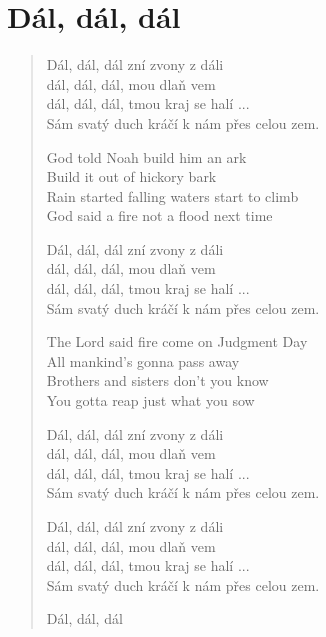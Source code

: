 \section{Dál, dál, dál}

\begin{verse}
Dál, dál, dál zní zvony z dáli \\
dál, dál, dál, mou dlaň vem \\
dál, dál, dál, tmou kraj se halí ... \\
Sám svatý duch kráčí k nám přes celou zem.

God told Noah build him an ark \\
Build it out of hickory bark \\
Rain started falling waters start to climb \\
God said a fire not a flood next time

Dál, dál, dál zní zvony z dáli \\
dál, dál, dál, mou dlaň vem \\
dál, dál, dál, tmou kraj se halí ... \\
Sám svatý duch kráčí k nám přes celou zem.

The Lord said fire come on Judgment Day \\
All mankind's gonna pass away \\
Brothers and sisters don't you know \\
You gotta reap just what you sow

Dál, dál, dál zní zvony z dáli \\
dál, dál, dál, mou dlaň vem \\
dál, dál, dál, tmou kraj se halí ... \\
Sám svatý duch kráčí k nám přes celou zem.

Dál, dál, dál zní zvony z dáli \\
dál, dál, dál, mou dlaň vem \\
dál, dál, dál, tmou kraj se halí ... \\
Sám svatý duch kráčí k nám přes celou zem.

Dál, dál, dál
\end{verse}
